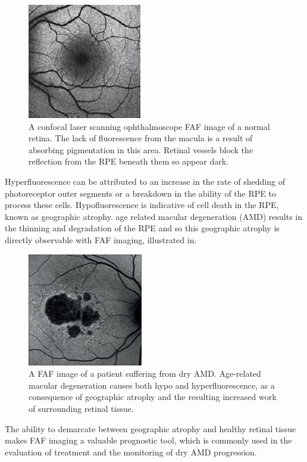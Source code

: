 \begin{figure}[htbp]
\centering
\includegraphics{figures/faf}
\caption{A confocal laser scanning ophthalmoscope FAF image of a normal retina. The lack of fluorescence from the macula is a result of absorbing pigmentation in this area. Retinal vessels block the reflection from the RPE beneath them so appear dark.}
\label{fig:faf}
   \end{figure}

Hyperfluorescence can be attributed to an increase in the rate
of shedding of photoreceptor outer segments or a breakdown in
the ability of the RPE to process these cells. Hypofluorescence
is indicative of cell death in the RPE, known as geographic atrophy.
age related macular degeneration (AMD) results in the thinning and
degradation of the RPE and so this geographic atrophy is directly
observable with FAF imaging, illustrated in.

\begin{figure}[htbp]
\centering
\includegraphics{figures/fafamd}
\caption{A FAF image of a patient suffering from dry AMD. Age-related macular degeneration causes both hypo and hyperfluorescence, as a consequence of geographic atrophy and the resulting increased work of surrounding retinal tissue.\cite{2_audo_2015}}
\label{fig:fafamd}
   \end{figure}

The ability to demarcate between geographic atrophy and healthy retinal tissue makes FAF imaging a valuable prognostic tool, which is commonly used in the evaluation of treatment and the monitoring of dry AMD progression.\cite{1_murphy_2015}

